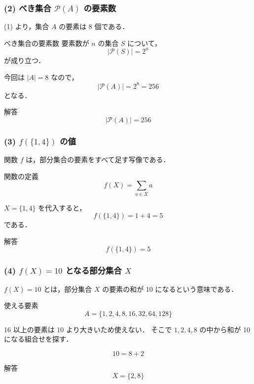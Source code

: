 \begin{frame}
    \frametitle{(2) べき集合 \(\mathcal{P}(A)\) の要素数}
    (1) より，集合 \(A\) の要素は 8 個である．

    \begin{block}{べき集合の要素数}
        要素数が \(n\) の集合 \(S\) について，
        \[
            |\mathcal{P}(S)|=2^n
        \]
        が成り立つ．
    \end{block}

    \pause

    今回は \(|A|=8\) なので，
    \[
        |\mathcal{P}(A)|=2^8=256
    \]
    となる．

    \begin{alertblock}{解答}
        \[
            |\mathcal{P}(A)|=256
        \]
    \end{alertblock}
\end{frame}

\begin{frame}
    \frametitle{(3) \(f(\{1,4\})\) の値}
    関数 \(f\) は，部分集合の要素をすべて足す写像である．

    \begin{block}{関数の定義}
        \[
            f(X)=\sum_{a\in X} a
        \]
    \end{block}

    \pause

    \(X=\{1,4\}\) を代入すると，
    \[
        f(\{1,4\})=1+4=5
    \]
    である．

    \begin{alertblock}{解答}
        \[
            f(\{1,4\})=5
        \]
    \end{alertblock}
\end{frame}


\begin{frame}
    \frametitle{(4) \(f(X)=10\) となる部分集合 \(X\)}
    \(f(X)=10\) とは，部分集合 \(X\) の要素の和が 10 になるという意味である．

    \begin{block}{使える要素}
        \[
            A=\{1,2,4,8,16,32,64,128\}
        \]
    \end{block}

    \pause

    16 以上の要素は 10 より大きいため使えない．
    そこで \(1,2,4,8\) の中から和が 10 になる組合せを探す．

    \pause

    \[
        10=8+2
    \]

    \begin{alertblock}{解答}
        \[
            X=\{2,8\}
        \]
    \end{alertblock}
\end{frame}
